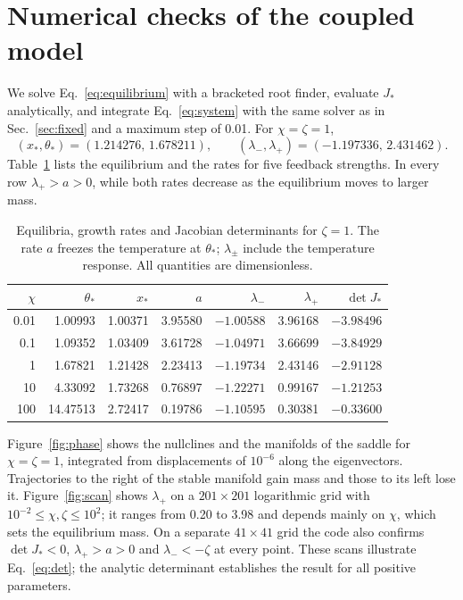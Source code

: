 \documentclass[11pt,a4paper]{article}
\begin{document}
\section{Numerical checks of the coupled model}\label{sec:numerics}
We solve Eq.~\eqref{eq:equilibrium} with a bracketed root finder, evaluate $J_*$ analytically, and integrate Eq.~\eqref{eq:system} with the same solver as in Sec.~\ref{sec:fixed} and a maximum step of 0.01. For $\chi=\zeta=1$,
\begin{equation*}
 (x_*,\theta_*)=(1.214276,\,1.678211),\qquad (\lambda_-,\lambda_+)=(-1.197336,\,2.431462).
\end{equation*}
Table~\ref{tab:scan} lists the equilibrium and the rates for five feedback strengths. In every row $\lambda_+>a>0$, while both rates decrease as the equilibrium moves to larger mass.

\begin{table}[tbp]
\centering\small
\caption{Equilibria, growth rates and Jacobian determinants for $\zeta=1$. The rate $a$ freezes the temperature at $\theta_*$; $\lambda_\pm$ include the temperature response. All quantities are dimensionless.}
\label{tab:scan}
\begin{tabular}{@{}rrrrrrr@{}}
\toprule
$\chi$ & $\theta_*$ & $x_*$ & $a$ & $\lambda_-$ & $\lambda_+$ & $\det J_*$\\
\midrule
0.01 & 1.00993 & 1.00371 & 3.95580 & $-1.00588$ & 3.96168 & $-3.98496$\\
0.1 & 1.09352 & 1.03409 & 3.61728 & $-1.04971$ & 3.66699 & $-3.84929$\\
1 & 1.67821 & 1.21428 & 2.23413 & $-1.19734$ & 2.43146 & $-2.91128$\\
10 & 4.33092 & 1.73268 & 0.76897 & $-1.22271$ & 0.99167 & $-1.21253$\\
100 & 14.47513 & 2.72417 & 0.19786 & $-1.10595$ & 0.30381 & $-0.33600$\\
\bottomrule
\end{tabular}
\end{table}

Figure~\ref{fig:phase} shows the nullclines and the manifolds of the saddle for $\chi=\zeta=1$, integrated from displacements of $10^{-6}$ along the eigenvectors. Trajectories to the right of the stable manifold gain mass and those to its left lose it. Figure~\ref{fig:scan} shows $\lambda_+$ on a $201\times201$ logarithmic grid with $10^{-2}\le\chi,\zeta\le10^2$; it ranges from 0.20 to 3.98 and depends mainly on $\chi$, which sets the equilibrium mass. On a separate $41\times41$ grid the code also confirms $\det J_*<0$, $\lambda_+>a>0$ and $\lambda_-<-\zeta$ at every point. These scans illustrate Eq.~\eqref{eq:det}; the analytic determinant establishes the result for all positive parameters.
\end{document}
